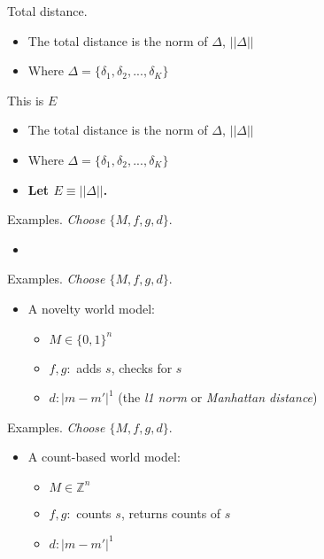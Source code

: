 \documentclass[10pt]{beamer}
\begin{document}
\begin{frame}[fragile]{Total distance.}
\begin{itemize}
\item The total distance is the norm of $\Delta$, $||\Delta||$
\item Where $\Delta = \{\delta_1, \delta_2,...,\delta_K\}$
\end{itemize}
\end{frame}

\begin{frame}[fragile]{This is $E$}
\begin{itemize}
\item The total distance is the norm of $\Delta$, $||\Delta||$
\item Where $\Delta = \{\delta_1, \delta_2,...,\delta_K\}$
\item \textbf{Let $E \equiv ||\Delta||$.}
\end{itemize}
\end{frame}

\begin{frame}[fragile]{Examples.}
\textit{Choose $\{M, f, g, d\}$}.
\begin{itemize}
    \item 
\end{itemize}
\end{frame}

\begin{frame}[fragile]{Examples.}
\textit{Choose $\{M, f, g, d\}$}.
\begin{itemize}
    \item A novelty world model:
    \begin{itemize}
        \item $M \in \{0,1\}^n$
        \item $f,g: $ adds $s$, checks for $s$
        \item $d: |m - m'|^1$ (the \textit{l1 norm} or \textit{Manhattan distance})
    \end{itemize}
\end{itemize}
\end{frame}

\begin{frame}[fragile]{Examples.}
\textit{Choose $\{M, f, g, d\}$}.
\begin{itemize}
    \item A count-based world model:
    \begin{itemize}
        \item $M \in \mathbb{Z}^n$
        \item $f,g: $ counts $s$, returns counts of $s$
        \item $d: |m - m'|^1$ 
    \end{itemize}
\end{itemize}
\end{frame}
\end{document}
